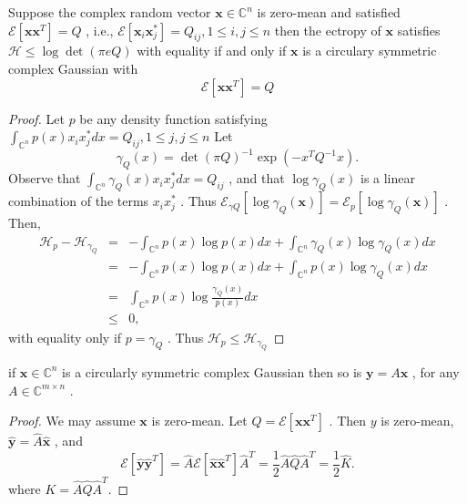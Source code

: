 \documentclass[10pt,a4paper,UTF8]{article}
\begin{document}
\begin{theorem}
Suppose the complex random vector \(\mathbf{x}\in \mathbb{C}^n\) is zero-mean and satisfied \(\mathcal{E}[\mathbf{xx}^{T}] = Q\) , i.e., \(\mathcal{E}[\mathbf{x}_i\mathbf{x}_j^*]=Q_{ij}, 1\le i,j \le n\)  then the ectropy of \(\mathbf{x}\) satisfies \(\mathcal{H}\le \log \det(\pi eQ)\) with equality if and only if \(\mathbf{x}\) is a circulary symmetric complex Gaussian with 
\begin{equation}
  \mathcal{E}[\mathbf{xx}^{T}] = Q
\end{equation}
\end{theorem}
\begin{proof}
Let \(p\) be any density function satisfying  \(\int_{\mathbb{C}^n} p(x)x_ix_j^* dx= Q_{ij}, 1\le j,j\le n\)  Let
\begin{equation}
    \label{eq:20120323gammaq}
    \gamma_Q(x) = \det(\pi Q)^{-1} \exp(-x^{T}Q^{-1}x).
\end{equation}
Observe that \(\int_{\mathbb{C}^n} \gamma_Q (x) x_ix_j^* dx = Q_{ij}\) , and that \(\log \gamma_Q(x)\) is  a linear combination of the terms \(x_ix_j^*\) . Thus \(\mathcal{E}_{\gamma Q}[\log\gamma_Q(\mathbf{x})]=\mathcal{E}_{p}[\log\gamma_Q(\mathbf{x})]\) . Then, 
\begin{eqnarray}
  \label{eq:20120323hpminushgammaq}
  \mathcal{H}_{p} - \mathcal{H}_{\gamma_Q} &=& -\int_{\mathbb{C}^n} p(x)\log{p(x)}dx + \int_{\mathbb{C}^n}  \gamma_Q(x)\log  \gamma_Q(x)dx \nonumber \\
     &=& -\int_{\mathbb{C}^n} p(x)\log{p(x)}dx + \int_{\mathbb{C}^n} p(x)\log  \gamma_Q(x)dx \nonumber \\
     &=& \int_{\mathbb{C}^n} p(x)\log \frac{ \gamma_Q(x)}{p(x)} dx \nonumber \\
     &\le&  0,
\end{eqnarray}
with equality only if \(p=\gamma_Q\) . Thus \(\mathcal{H}_{p} \le \mathcal{H}_{\gamma_Q}\)
\end{proof}

\begin{theorem}
if \(\mathbf{x}\in \mathbb{C}^n\) is a circularly symmetric complex Gaussian then so is \(\mathbf{y}=A\mathbf{x}\) , for any \(A\in \mathbb{C}^{m\times n}\) .
\end{theorem}

\begin{proof}
We may assume \(\mathbf{x}\)  is zero-mean. Let \(Q=\mathcal{E}[\mathbf{xx}^{T}]\) . Then \(y\) is zero-mean, \(\hat{\mathbf{y}} = \hat{A}\hat{\mathbf{x}}\) , and
\begin{equation}
   \mathcal{E}    [\hat{\mathbf{y}}\hat{\mathbf{y}}^{T}] = \hat{A} \mathcal{E}[\hat{\mathbf{x}}\hat{\mathbf{x}}^{T}]\hat{A}^{T} = \frac{1}{2} \hat{A}\hat{Q}\hat{A}^{T} =\frac{1}{2}\hat{K}.
\end{equation}
where \(K=\hat{A}\hat{Q}\hat{A}^{T}\).
\end{proof}
\end{document}

